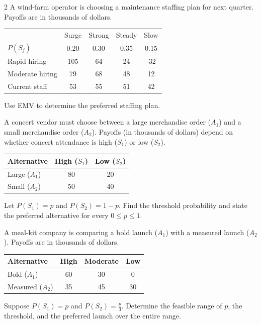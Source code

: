 \begin{multicols}{2}
		A wind-farm operator is choosing a maintenance staffing plan for next quarter. Payoffs are in thousands of dollars.\vspace{-3mm}
		\begin{center}\setlength{\tabcolsep}{1.5pt}\renewcommand{\arraystretch}{1.1}
			\begin{tabular}{lcccc}\toprule
			&Surge&Strong&Steady&Slow\\
			$P(S_j)$&0.20&0.30&0.35&0.15\\ \midrule
			Rapid hiring&105&64&24&-32\\
			Moderate hiring&79&68&48&12\\
			Current staff&53&55&51&42\\ \bottomrule
			\end{tabular}
		\end{center}\vspace{-3mm}
		Use EMV to determine the preferred staffing plan.

		A concert vendor must choose between a large merchandise order ($A_1$) and a small merchandise order ($A_2$). Payoffs (in thousands of dollars) depend on whether concert attendance is high ($S_1$) or low ($S_2$).\vspace{-3mm}
		\begin{center}\setlength{\tabcolsep}{4pt}\renewcommand{\arraystretch}{1.15}
			\begin{tabular}{lcc}\toprule
			Alternative&High ($S_1$)&Low ($S_2$)\\ \midrule
			Large ($A_1$)&80&20\\
			Small ($A_2$)&50&40\\ \bottomrule
			\end{tabular}
		\end{center}\vspace{-2mm}
		Let $P(S_1)=p$ and $P(S_2)=1-p$. Find the threshold probability and state the preferred alternative for every $0\le p\le1$.

		A meal-kit company is comparing a bold launch ($A_1$) with a measured launch ($A_2$). Payoffs are in thousands of dollars.\vspace{-3mm}
		\begin{center}\setlength{\tabcolsep}{2pt}\renewcommand{\arraystretch}{1.1}
			\begin{tabular}{lccc}\toprule
				Alternative&High&Moderate&Low\\ \midrule
				Bold ($A_1$)&60&30&0\\
				Measured ($A_2$)&35&45&30\\ \bottomrule
			\end{tabular}
		\end{center}\vspace{-3mm}
		Suppose $P(S_1)=p$ and $P(S_2)=\frac{p}{3}$. Determine the feasible range of $p$, the threshold, and the preferred launch over the entire range.


\end{multicols}
